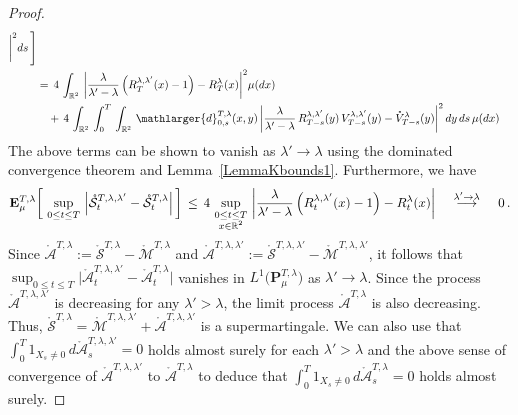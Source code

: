 \documentclass[10pt]{article}
\def\stackrel#1#2{\mathrel{\mathop{#2}\limits^{#1}}}
\numberwithin{equation}{section}
\theoremstyle{definition}
\newcommand{\R}{{\mathbb R}}
\begin{document}
\begin{proof}
\begin{align*}
 \bigg|^2 ds\,\Bigg]\\
 &= \, 4\,\int_{\R^2} \,  \bigg| \frac{\lambda}{\lambda'-\lambda} \, \Big(R_{T }^{\lambda,\lambda' }(x) -1\Big)   - R_{T }^{\lambda}(x) 
 \bigg|^2    \mu(dx)\nonumber \\  &\text{}\,\,\,\,\,\,+\,  4\, \int_{\R^2} \, \int_0^T\, \int_{\R^2} \, \mathlarger{d}^{T,\lambda}_{0,s}(x,y) \,\bigg|\frac{\lambda}{\lambda'-\lambda} \,R^{\lambda,\lambda' }_{T-s}(y)\, V_{T-s }^{\lambda,\lambda'}(y)    - \mathring{V}_{T-s }^{\lambda}(y) 
 \bigg|^2 \,dy   \,ds \,  \mu(dx)
\end{align*}
The above terms can be shown to vanish as $\lambda'\rightarrow \lambda$ using the dominated convergence theorem and Lemma~\ref{LemmaKbounds1}.  Furthermore, we have 
\begin{align*}
\mathbf{E}^{T,\lambda}_{\mu}\bigg[ \,\sup_{0\leq t\leq T}\, \Big|\mathring{\mathcal{S}}^{T,\lambda,\lambda'}_t -\mathring{\mathcal{S}}^{T,\lambda}_t 
 \Big|\, \bigg]
 \,\leq  \, 4 \, \sup_{ \substack{ 0\leq t\leq T \\ x\in \R^2 } } \, \bigg|  \frac{\lambda}{\lambda'-\lambda} \, \Big(R_{t}^{\lambda,\lambda'}(x) -1\Big)   - R_{t }^{\lambda}(x) 
 \bigg| \hspace{.4cm}  \stackrel{\lambda'\rightarrow \lambda }{\longrightarrow }  \hspace{.4cm}  0\,.
\end{align*}
Since $\mathring{\mathcal{A}}^{T,\lambda}:=\mathring{\mathcal{S}}^{T,\lambda}-\mathring{\mathcal{M}}^{T,\lambda}$ and $\mathring{\mathcal{A}}^{T,\lambda,\lambda'} :=\mathring{\mathcal{S}}^{T,\lambda,\lambda'}- \mathring{\mathcal{M}}^{T,\lambda,\lambda'} $, it follows that $\sup_{0\leq t\leq T} \big|\mathring{\mathcal{A}}^{T,\lambda,\lambda'}_t -\mathring{\mathcal{A}}^{T,\lambda}_t 
 \big|$ vanishes in $L^1\big(  \mathbf{P}^{T,\lambda}_{\mu} \big)$ as $\lambda'\rightarrow \lambda$.  Since the process $ \mathring{\mathcal{A}}^{T,\lambda,\lambda'}  $ is decreasing for any $\lambda'>\lambda $, the limit process $\mathring{\mathcal{A}}^{T,\lambda}  $ is also decreasing.  Thus,  $\mathring{\mathcal{S}}^{T,\lambda}= \mathring{\mathcal{M}}^{T,\lambda,\lambda'}+\mathring{\mathcal{A}}^{T,\lambda,\lambda'}$ is a supermartingale.  We can also use that $\int_0^{T}1_{X_s\neq 0 }\, d\mathring{\mathcal{A}}^{T,\lambda,\lambda'}_s=0 $ holds almost surely for each $\lambda'>\lambda$ and  the above sense of convergence of $\mathring{\mathcal{A}}^{T,\lambda,\lambda'}$ to $\mathring{\mathcal{A}}^{T,\lambda} $ to deduce that  $\int_0^{T}1_{X_s\neq 0 }\, d\mathring{\mathcal{A}}^{T,\lambda}_s=0 $ holds almost surely.
\end{proof} 
 
\end{document}
